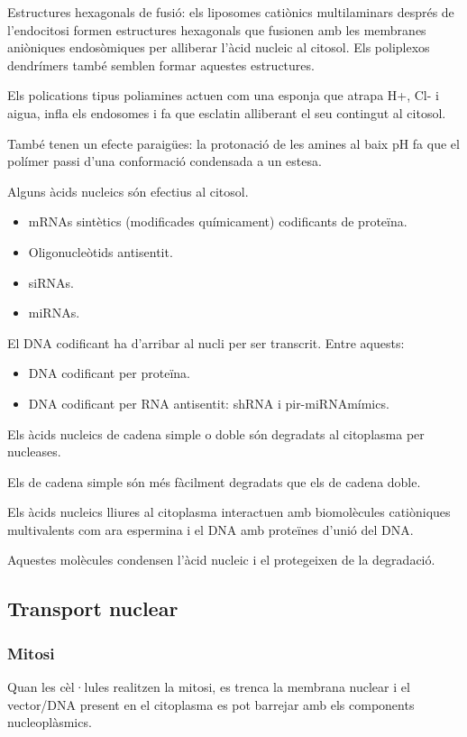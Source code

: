Estructures hexagonals de fusió: els liposomes catiònics multilaminars després de l'endocitosi formen estructures hexagonals que fusionen amb les membranes aniòniques endosòmiques per alliberar l'àcid nucleic al citosol. Els poliplexos dendrímers també semblen formar aquestes estructures.

Els polications tipus poliamines actuen com una esponja que atrapa H+, Cl- i aigua, infla els endosomes i fa que esclatin alliberant el seu contingut al citosol.

També tenen un efecte paraigües: la protonació de les amines al baix pH fa que el polímer passi d'una conformació condensada a un estesa.

Alguns àcids nucleics són efectius al citosol.
\begin{itemize}
\item mRNAs sintètics (modificades químicament) codificants de proteïna.
\item Oligonucleòtids antisentit.
\item siRNAs.
\item miRNAs.
\end{itemize}

El DNA codificant ha d'arribar al nucli per ser transcrit. Entre aquests:
\begin{itemize}
\item DNA codificant per proteïna.
\item DNA codificant per RNA antisentit: shRNA i pir-miRNAmímics.
\end{itemize}

Els àcids nucleics de cadena simple o doble són degradats al citoplasma per nucleases.

Els de cadena simple són més fàcilment degradats que els de cadena doble.

Els àcids nucleics lliures al citoplasma interactuen amb biomolècules catiòniques multivalents com ara espermina i el DNA amb proteïnes d'unió del DNA.

Aquestes molècules condensen l'àcid nucleic i el protegeixen de la degradació.

\subsection{Transport nuclear}
\label{sec:transport-nuclear}

\subsubsection{Mitosi}
\label{sec:mitosi}
Quan les cèl·lules realitzen la mitosi, es trenca la membrana nuclear i el vector/DNA present en el citoplasma es pot barrejar amb els components nucleoplàsmics.

